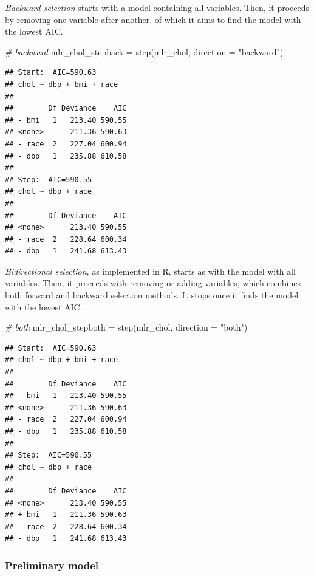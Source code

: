 \documentclass[
  10pt,
]{krantz}
\newenvironment{Shaded}{\begin{snugshade}}{\end{snugshade}}
\newcommand{\AttributeTok}[1]{\textcolor[rgb]{0.77,0.63,0.00}{#1}}
\newcommand{\CommentTok}[1]{\textcolor[rgb]{0.56,0.35,0.01}{\textit{#1}}}
\newcommand{\FunctionTok}[1]{\textcolor[rgb]{0.00,0.00,0.00}{#1}}
\newcommand{\NormalTok}[1]{#1}
\newcommand{\OtherTok}[1]{\textcolor[rgb]{0.56,0.35,0.01}{#1}}
\newcommand{\StringTok}[1]{\textcolor[rgb]{0.31,0.60,0.02}{#1}}
\begin{document}
\emph{Backward selection} starts with a model containing all variables. Then, it proceeds by removing one variable after another, of which it aims to find the model with the lowest AIC.

\begin{Shaded}
\begin{Highlighting}[]
\CommentTok{\# backward}
\NormalTok{mlr\_chol\_stepback }\OtherTok{=} \FunctionTok{step}\NormalTok{(mlr\_chol, }\AttributeTok{direction =} \StringTok{"backward"}\NormalTok{)}
\end{Highlighting}
\end{Shaded}

\begin{verbatim}
## Start:  AIC=590.63
## chol ~ dbp + bmi + race
## 
##        Df Deviance    AIC
## - bmi   1   213.40 590.55
## <none>      211.36 590.63
## - race  2   227.04 600.94
## - dbp   1   235.88 610.58
## 
## Step:  AIC=590.55
## chol ~ dbp + race
## 
##        Df Deviance    AIC
## <none>      213.40 590.55
## - race  2   228.64 600.34
## - dbp   1   241.68 613.43
\end{verbatim}

\emph{Bidirectional selection}, as implemented in R, starts as with the model with all variables. Then, it proceeds with removing or adding variables, which combines both forward and backward selection methods. It stops once it finds the model with the lowest AIC.

\begin{Shaded}
\begin{Highlighting}[]
\CommentTok{\# both}
\NormalTok{mlr\_chol\_stepboth }\OtherTok{=} \FunctionTok{step}\NormalTok{(mlr\_chol, }\AttributeTok{direction =} \StringTok{"both"}\NormalTok{)}
\end{Highlighting}
\end{Shaded}

\begin{verbatim}
## Start:  AIC=590.63
## chol ~ dbp + bmi + race
## 
##        Df Deviance    AIC
## - bmi   1   213.40 590.55
## <none>      211.36 590.63
## - race  2   227.04 600.94
## - dbp   1   235.88 610.58
## 
## Step:  AIC=590.55
## chol ~ dbp + race
## 
##        Df Deviance    AIC
## <none>      213.40 590.55
## + bmi   1   211.36 590.63
## - race  2   228.64 600.34
## - dbp   1   241.68 613.43
\end{verbatim}

\hypertarget{preliminary-model}{%
\subsubsection*{Preliminary model}\label{preliminary-model}}
\end{document}
